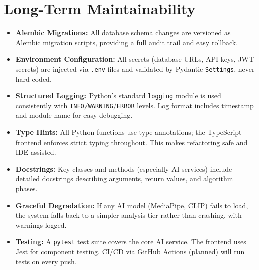 \documentclass[12pt,a4paper]{report}
\begin{document}
\section{Long-Term Maintainability}
\begin{itemize}[leftmargin=*]
    \item \textbf{Alembic Migrations:} All database schema changes are versioned as Alembic migration scripts, providing a full audit trail and easy rollback.
    \item \textbf{Environment Configuration:} All secrets (database URLs, API keys, JWT secrets) are injected via \texttt{.env} files and validated by Pydantic \texttt{Settings}, never hard-coded.
    \item \textbf{Structured Logging:} Python's standard \texttt{logging} module is used consistently with \texttt{INFO}/\texttt{WARNING}/\texttt{ERROR} levels. Log format includes timestamp and module name for easy debugging.
    \item \textbf{Type Hints:} All Python functions use type annotations; the TypeScript frontend enforces strict typing throughout. This makes refactoring safe and IDE-assisted.
    \item \textbf{Docstrings:} Key classes and methods (especially AI services) include detailed docstrings describing arguments, return values, and algorithm phases.
    \item \textbf{Graceful Degradation:} If any AI model (MediaPipe, CLIP) fails to load, the system falls back to a simpler analysis tier rather than crashing, with warnings logged.
    \item \textbf{Testing:} A \texttt{pytest} test suite covers the core AI service. The frontend uses Jest for component testing. CI/CD via GitHub Actions (planned) will run tests on every push.
\end{itemize}
\end{document}
